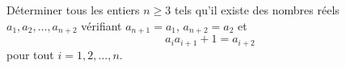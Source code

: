 Déterminer tous les entiers $n \geqslant 3$ tels qu'il existe des nombres réels $a_1, a_2, \ldots, a_{n+2}$
vérifiant $a_{n+1} = a_1$, $a_{n+2} = a_2$ et
\[
a_ia_{i+1} + 1 = a_{i+2}
\]
pour tout $i = 1, 2, \ldots, n$.

